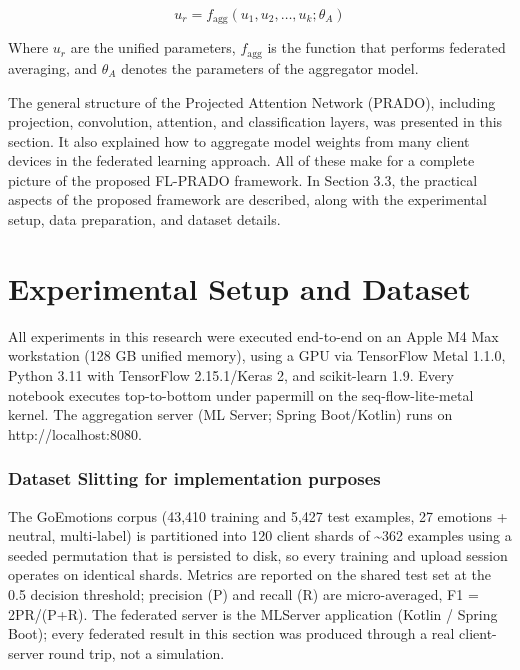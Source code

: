\begin{equation}
  u_{r} = f_{\text{agg}}(u_{1}, u_{2}, \ldots, u_{k}; \theta_{A})
  \label{eq:ch3_3_9}
\end{equation}

Where $u_{r}$ are the unified parameters, $f_{\text{agg}}$ is the function that performs federated averaging, and $\theta_{A}$ denotes the parameters of the aggregator model.

The general structure of the Projected Attention Network (PRADO), including projection, convolution, attention, and classification layers, was presented in this section. It also explained how to aggregate model weights from many client devices in the federated learning approach. All of these make for a complete picture of the proposed FL-PRADO framework. In Section 3.3, the practical aspects of the proposed framework are described, along with the experimental setup, data preparation, and dataset details.

\section{Experimental Setup and Dataset}
All experiments in this research were executed end-to-end on an Apple M4 Max workstation (128 GB unified memory), using a GPU via TensorFlow Metal 1.1.0, Python 3.11 with TensorFlow 2.15.1/Keras 2, and scikit-learn 1.9. Every notebook executes top-to-bottom under papermill on the seq-flow-lite-metal kernel. The aggregation server (ML Server; Spring Boot/Kotlin) runs on http://localhost:8080.

\subsubsection*{Dataset Slitting for implementation purposes}
The GoEmotions corpus (43,410 training and 5,427 test examples, 27 emotions + neutral, multi-label) \cite{ref77} is partitioned into 120 client shards of \textasciitilde{}362 examples using a seeded permutation that is persisted to disk, so every training and upload session operates on identical shards. Metrics are reported on the shared test set at the 0.5 decision threshold; precision (P) and recall (R) are micro-averaged, F1 = 2PR/(P+R). The federated server is the MLServer application (Kotlin / Spring Boot); every federated result in this section was produced through a real client-server round trip, not a simulation.

